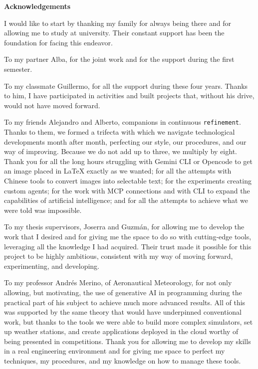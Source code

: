 \clearpage
\thispagestyle{empty}

\begin{flushright}
  {\fontsize{28pt}{28pt}\selectfont\bfseries Acknowledgements\par}
\end{flushright}

\vspace{0.3cm}

\begingroup
{}\textwidth
\parindent=0pt
\fontsize{10pt}{12.5pt}\itshape\selectfont

I would like to start by thanking my family for always being there and for
allowing me to study at university. Their constant support has been the foundation
for facing this endeavor. 

To my partner Alba, for the joint work and for the support during the first
semester.

To my classmate Guillermo, for all the support during these four years. Thanks to
him, I have participated in activities and built projects that, without his drive, would not have
moved forward.

To my friends Alejandro and Alberto, companions in continuous \texttt{refinement}. Thanks
to them, we formed a trifecta with which we navigate technological developments month after
month, perfecting our style, our procedures, and our way of improving.
Because we do not add up to three, we multiply by eight. Thank you for all the long hours
struggling with Gemini CLI or Opencode to get an image placed in LaTeX exactly as
we wanted; for all the attempts with Chinese tools to convert images into selectable
text; for the experiments creating custom agents; for the work with MCP connections and with
CLI to expand the capabilities of artificial intelligence; and for all the attempts to achieve
what we were told was impossible.

To my thesis supervisors, Joserra and Guzmán, for allowing me to develop the work
that I desired and for giving me the space to do so with cutting-edge tools,
leveraging all the knowledge I had acquired. Their trust
made it possible for this project to be highly ambitious, consistent with my way of
moving forward, experimenting, and developing. 

To my professor Andrés Merino, of Aeronautical Meteorology, for not only allowing,
but motivating, the use of generative AI in programming during the practical part of
his subject to achieve much more advanced results. All of this was supported by
the same theory that would have underpinned conventional work, but thanks to
the tools we were able to build more complex simulators, set up weather stations,
and create applications deployed in the cloud worthy of being presented
in competitions. Thank you for allowing me to develop my skills in a
real engineering environment and for giving me space to perfect my techniques, my
procedures, and my knowledge on how to manage these tools.

